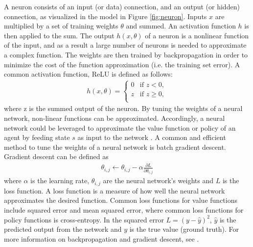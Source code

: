    
A neuron consists of an input (or data) connection, and an output (or hidden) connection, as visualized in the model in Figure \ref{fig:neuron}. Inputs $x$ are multiplied by a set of training weights $\theta$ and summed. An activation function $h$ is then applied to the sum. The output $h(x,\theta)$ of a neuron is a nonlinear function of the input, and as a result a large number of neurons is needed to approximate a complex function. The weights are then trained by backpropagation in order to minimize the cost of the function approximation (i.e. the training set error). A common activation function, ReLU is defined as follows:
\begin{align*}
    h(x,\theta) =
    \begin{cases}
        0 & \text{if } z < 0,\\
        z & \text{if } z \ge 0,\\
    \end{cases}
\end{align*}
where z is the summed output of the neuron. By tuning the weights of a neural network, non-linear functions can be approximated. Accordingly, a neural network could be leveraged to approximate the value function or policy of an agent by feeding state $s$ as input to the network \cite{eriksson2021deep}. 
A common and efficient method to tune the weights of a neural network is batch gradient descent. Gradient descent can be defined as
\begin{align*}
    \theta_{i, j} \leftarrow \theta_{i, j}-\alpha \frac{\partial L}{\partial \theta_{i, j}}
\end{align*}
where $\alpha$ is the learning rate, $\theta_{i,j}$ are the neural network's weights and $L$ is the loss function.
A loss function is a measure of how well the neural network approximates the desired function. Common loss functions for value functions include squared error and mean squared error, where common loss functions for policy functions is cross-entropy. In the squared error $L=(y-\hat{y})^{2}$, $\hat{y}$ is the predicted output from the network and $y$ is the true value (ground truth).  For more information on backpropagation and gradient descent, see \cite{sutton2018reinforcement}. 

